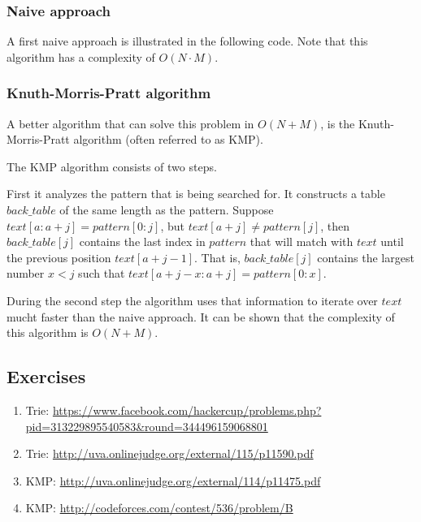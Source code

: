 \subsubsection{Naive approach}
A first naive approach is illustrated in the following code. Note that this algorithm has a complexity of $O(N \cdot M)$.


\subsubsection{Knuth-Morris-Pratt algorithm}
A better algorithm that can solve this problem in $O(N + M)$, is the Knuth-Morris-Pratt algorithm (often referred to as KMP).

The KMP algorithm consists of two steps. 

First it analyzes the pattern that is being searched for. It constructs a table $back\_table$ of the same length as the pattern. Suppose $text[a:a+j] = pattern[0:j]$, but $text[a+j] \neq pattern[j]$, then $back\_table[j]$ contains the last index in $pattern$ that will match with $text$ until the previous position $text[a+j-1]$. That is, $back\_table[j]$ contains the largest number $x < j$ such that $text[a+j-x:a+j]=pattern[0:x]$.

During the second step the algorithm uses that information to iterate over $text$ mucht faster than the naive approach.
It can be shown that the complexity of this algorithm is $O(N+M)$.


\subsection{Exercises}
\begin{enumerate}
\item  Trie: \url{https://www.facebook.com/hackercup/problems.php?pid=313229895540583&round=344496159068801}

\item Trie: \url{http://uva.onlinejudge.org/external/115/p11590.pdf}

\item KMP: \url{http://uva.onlinejudge.org/external/114/p11475.pdf}

\item KMP: \url{http://codeforces.com/contest/536/problem/B}
\end{enumerate}